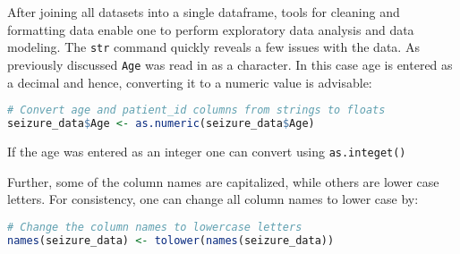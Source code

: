 After joining all datasets into a single dataframe, tools for cleaning and formatting data enable one to perform exploratory data analysis and data modeling. The \verb|str| command quickly reveals a few issues with the data. As previously discussed \verb|Age| was read in as a character. In this case age is entered as a decimal and hence, converting it to a numeric value is advisable:
\begin{lstlisting}[language=R]
# Convert age and patient_id columns from strings to floats
seizure_data$Age <- as.numeric(seizure_data$Age)
\end{lstlisting}
If the age was entered as an integer one can convert using \verb|as.integet()|

Further, some of the column names are capitalized, while others are lower case letters. For consistency, one can change all column names to lower case by:
\begin{lstlisting}[language=R]
# Change the column names to lowercase letters
names(seizure_data) <- tolower(names(seizure_data))
\end{lstlisting}

